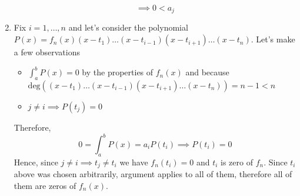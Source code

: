 \documentclass[8pt]{article} %
\begin{document}
\begin{enumerate}[label=\bfseries\arabic*.]
{\begin{enumerate}[label=(\arabic*)]
{\[	\implies 0<a_j\]
	}
	\end{enumerate}
}
\item{Fix $i=1,\dots,n$ and let's consider the polynomial $P(x)=f_n(x)(x-t_1)\dots(x-t_{i-1})(x-t_{i+1})\dots(x-t_n)$. Let's make a few
observations
\begin{itemize}
\item{$\int_a^b P(x)=0$ by the properties of $f_n(x)$ and because $\text{deg}((x-t_1)\dots(x-t_{i-1})(x-t_{i+1})\dots(x-t_n))=n-1<n$}
\item{$j\neq i\implies P(t_j)=0$}
\end{itemize}
Therefore, \[0=\int_a^b P(x)=a_i P(t_i)\implies P(t_i)=0\] Hence, since $j\neq i\implies t_j\neq t_i$ we have $f_n(t_i)=0$ and $t_i$ is zero of
$f_n$. Since $t_i$ above was chosen arbitrarily, argument applies to all of them, therefore all of them are zeros of $f_n(x)$.
}
\end{enumerate}
\end{document}
